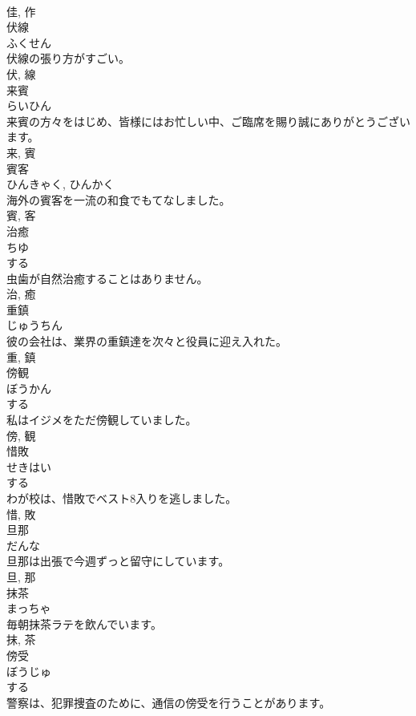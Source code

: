\documentclass[8pt]{extreport}
\begin{document}
\begin{CJK}{UTF8}{min}
\\	佳, 作	
\\	伏線	
\\	ふくせん	
\\	伏線の張り方がすごい。	
\\	伏, 線	
\\	来賓	
\\	らいひん	
\\	来賓の方々をはじめ、皆様にはお忙しい中、ご臨席を賜り誠にありがとうございます。	
\\	来, 賓	
\\	賓客	
\\	ひんきゃく, ひんかく	
\\	海外の賓客を一流の和食でもてなしました。	
\\	賓, 客	
\\	治癒	
\\	ちゆ	
\\	する 
\\	虫歯が自然治癒することはありません。	
\\	治, 癒	
\\	重鎮	
\\	じゅうちん	
\\	彼の会社は、業界の重鎮達を次々と役員に迎え入れた。	
\\	重, 鎮	
\\	傍観	
\\	ぼうかん	
\\	する 
\\	私はイジメをただ傍観していました。	
\\	傍, 観	
\\	惜敗	
\\	せきはい	
\\	する 
\\	わが校は、惜敗でベスト8入りを逃しました。	
\\	惜, 敗	
\\	旦那	
\\	だんな	
\\	旦那は出張で今週ずっと留守にしています。	
\\	旦, 那	
\\	抹茶	
\\	まっちゃ	
\\	毎朝抹茶ラテを飲んでいます。	
\\	抹, 茶	
\\	傍受	
\\	ぼうじゅ	
\\	する 
\\	警察は、犯罪捜査のために、通信の傍受を行うことがあります。	

\end{CJK}
\end{document}
